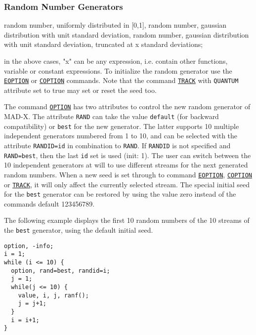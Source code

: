 \subsubsection{Random Number Generators}
\label{subsubsec:random}
\begin{madlist}
   random number, uniformly distributed in [0,1], 
   random number, gaussian distribution with unit
  standard deviation,  
   random number, gaussian distribution with unit
  standard deviation, truncated at x standard deviations;  
\end{madlist}

in the above cases, "x" can be any expression, i.e. contain other
functions, variable or constant expressions. To initialize the \madx
random generator use the \hyperref[sec:eoption]{\texttt{EOPTION}} or  \hyperref[sec:coption]{\texttt{COPTION}} commands. Note that the command \hyperref[sec:track]{\texttt{TRACK}} with \texttt{QUANTUM} attribute set to true may set or reset the seed too. 

The command  \hyperref[sec:option]{\texttt{OPTION}} has two attributes to control the new random generator of MAD-X. The attribute \texttt{RAND} can take the value \texttt{default} (for backward compatibility) or \texttt{best} for the new generator. The latter supports 10 multiple independent generators numbered from 1 to 10, and can be selected with the attribute \texttt{RANDID=id} in combination to \texttt{RAND}. If \texttt{RANDID} is not specified and \texttt{RAND=best}, then the last \texttt{id} set is used (init: 1). The user can switch between the 10 independent generators at will to use different streams for the next generated random numbers. When a new seed is set through to command \hyperref[sec:eoption]{\texttt{EOPTION}},  \hyperref[sec:coption]{\texttt{COPTION}} or \hyperref[sec:track]{\texttt{TRACK}}, it will only affect the currently selected stream. The special initial seed for the \texttt{best} generator can be restored by using the value zero instead of the commands default 123456789. 

The following example displays the first 10 random numbers of the 10 streams of the \texttt{best} generator, using the default initial seed.

\begin{verbatim}
option, -info;
i = 1;
while (i <= 10) {
  option, rand=best, randid=i;
  j = 1;
  while(j <= 10) {
    value, i, j, ranf();
    j = j+1;
  }
  i = i+1;
}
\end{verbatim}


